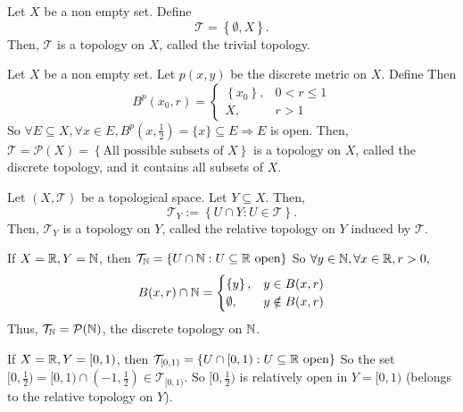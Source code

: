 \begin{exmp}
    Let $X$ be a non empty set. Define 
    \[
        \mathcal{T} = \left\{ \emptyset, X \right\} .
    \]
    Then, $\mathcal{T}$ is a topology on $X$, called the trivial topology.
    
\end{exmp}

\begin{exmp}
    Let $X$ be a non empty set. Let $p(x, y)$ be the discrete metric on $X$. Define
    Then \[ B^p(x_0, r) = \begin{cases}
        \left\{ x_0 \right\} , & 0 < r \leq 1 \\
        X, & r > 1
    \end{cases}\]
    So $\forall E \subseteq X, \forall x \in E, B^p(x, \frac{1}{2}) = \{x\} \subseteq E 
    \Rightarrow E$ is open. Then, \newline $\mathcal{T} = \mathcal{P}(X) = \left\{ \text{All possible subsets of }
     X \right\}$ is a topology on $X$, called the discrete topology, and it contains all subsets of $X$.
    
\end{exmp}

\begin{exmp}
    Let $(X, \mathcal{T})$ be a topological space. Let $Y \subseteq X$. Then,
    \[
        \mathcal{T}_Y := \left\{ U \cap Y : U \in \mathcal{T}  \right\} .
    \]
    Then, $\mathcal{T}_Y$ is a topology on $Y$, called the relative topology on $Y$ 
    induced by $\mathcal{T}$.

    If $X = \mathbb{R}, Y = \mathbb{N}$, then $\mathcal{T}_{\mathbb{N}} = \left\{ U \cap \mathbb{N} : U \subseteq \mathbb{R} \text{ open}\right\}$
    So $\forall y \in \mathbb{N}, \forall x \in \mathbb{R}, r > 0, $ \[B(x, r) \cap \mathbb{N} = \begin{cases}
        \left\{ y \right\} , & y \in B(x, r) \\
        \emptyset, & y \notin B(x, r)
    \end{cases}\]
    Thus, $\mathcal{T}_{\mathbb{N}} = \mathcal{P}(\mathbb{N})$, the discrete topology on $\mathbb{N}$.
    
    If $X = \mathbb{R}, Y = [0, 1)$, then $\mathcal{T}_{[0, 1)} = \left\{ U \cap [0, 1) : U \subseteq \mathbb{R} 
    \text{ open}\right\}$
    So the set $[0, \frac{1}{2}) = [0, 1) \cap (-1, \frac{1}{2}) \in \mathcal{T}_{[0, 1)}$.
    So $[0, \frac{1}{2})$ is relatively open in $Y = [0, 1)$ (belongs to the relative topology on $Y$).
\end{exmp}

